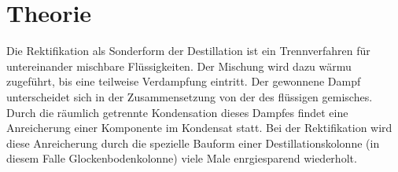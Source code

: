 \section{Theorie}
\label{sec:theorie}

Die Rektifikation als Sonderform der Destillation ist ein Trennverfahren für untereinander mischbare Flüssigkeiten. Der Mischung wird dazu wärmu zugeführt, bis eine teilweise Verdampfung eintritt. Der gewonnene Dampf unterscheidet sich in der Zusammensetzung von der des flüssigen gemisches. Durch die räumlich getrennte Kondensation dieses Dampfes findet eine Anreicherung einer Komponente im Kondensat statt. Bei der Rektifikation wird diese Anreicherung durch die spezielle Bauform einer Destillationskolonne (in diesem Falle Glockenbodenkolonne) viele Male enrgiesparend wiederholt.